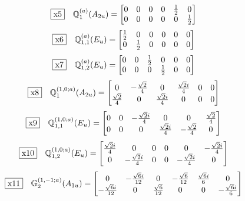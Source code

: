 \documentclass[fleqn,10pt,landscape]{jsarticle}
\begin{document}
\begin{dmath*}
\fbox{x5}\quad \mathbb{Q}_{1}^{(a)}(A_{2u})=\begin{bmatrix} 0 & 0 & 0 & 0 & \frac{1}{2} & 0 \\ 0 & 0 & 0 & 0 & 0 & \frac{1}{2} \end{bmatrix}
\end{dmath*}
\begin{dmath*}
\fbox{x6}\quad \mathbb{Q}_{1,1}^{(a)}(E_{u})=\begin{bmatrix} \frac{1}{2} & 0 & 0 & 0 & 0 & 0 \\ 0 & \frac{1}{2} & 0 & 0 & 0 & 0 \end{bmatrix}
\end{dmath*}
\begin{dmath*}
\fbox{x7}\quad \mathbb{Q}_{1,2}^{(a)}(E_{u})=\begin{bmatrix} 0 & 0 & \frac{1}{2} & 0 & 0 & 0 \\ 0 & 0 & 0 & \frac{1}{2} & 0 & 0 \end{bmatrix}
\end{dmath*}
\begin{dmath*}
\fbox{x8}\quad \mathbb{Q}_{1}^{(1,0;a)}(A_{2u})=\begin{bmatrix} 0 & - \frac{\sqrt{2}}{4} & 0 & \frac{\sqrt{2} i}{4} & 0 & 0 \\ \frac{\sqrt{2}}{4} & 0 & \frac{\sqrt{2} i}{4} & 0 & 0 & 0 \end{bmatrix}
\end{dmath*}
\begin{dmath*}
\fbox{x9}\quad \mathbb{Q}_{1,1}^{(1,0;a)}(E_{u})=\begin{bmatrix} 0 & 0 & - \frac{\sqrt{2} i}{4} & 0 & 0 & \frac{\sqrt{2}}{4} \\ 0 & 0 & 0 & \frac{\sqrt{2} i}{4} & - \frac{\sqrt{2}}{4} & 0 \end{bmatrix}
\end{dmath*}
\begin{dmath*}
\fbox{x10}\quad \mathbb{Q}_{1,2}^{(1,0;a)}(E_{u})=\begin{bmatrix} \frac{\sqrt{2} i}{4} & 0 & 0 & 0 & 0 & - \frac{\sqrt{2} i}{4} \\ 0 & - \frac{\sqrt{2} i}{4} & 0 & 0 & - \frac{\sqrt{2} i}{4} & 0 \end{bmatrix}
\end{dmath*}
\begin{dmath*}
\fbox{x11}\quad \mathbb{G}_{2}^{(1,-1;a)}(A_{1u})=\begin{bmatrix} 0 & - \frac{\sqrt{6} i}{12} & 0 & - \frac{\sqrt{6}}{12} & \frac{\sqrt{6} i}{6} & 0 \\ - \frac{\sqrt{6} i}{12} & 0 & \frac{\sqrt{6}}{12} & 0 & 0 & - \frac{\sqrt{6} i}{6} \end{bmatrix}
\end{dmath*}
\end{document}
